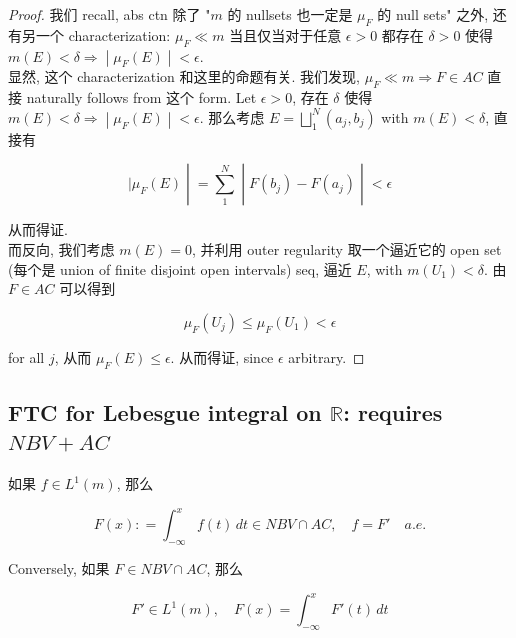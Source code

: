 \documentclass{qlnotes-export}
\begin{document}
\begin{proof}

我们 recall, abs ctn 除了 "\(m\) 的 nullsets 也一定是 \(\mu_{F}\) 的 null sets" 之外, 还有另一个 characterization: \(\mu_{F} \ll m\) 当且仅当对于任意 \(\epsilon > 0\) 都存在 \(\delta > 0\) 使得 \(\left. m(E) < \delta\Longrightarrow \middle| \mu_{F}(E) \middle| < \epsilon \right.\).\\
显然, 这个 characterization 和这里的命题有关. 我们发现, \(\mu_{F} \ll m\Longrightarrow F \in AC\) 直接 naturally follows from 这个 form. Let \(\epsilon > 0\), 存在 \(\delta\) 使得 \(\left. m(E) < \delta\Longrightarrow \middle| \mu_{F}(E) \middle| < \epsilon \right.\). 那么考虑 \(E = \bigsqcup_{1}^{N}(a_{j},b_{j})\) with \(m(E) < \delta\), 直接有

\[\left. |\mu_{F}(E) \middle| = \sum\limits_{1}^{N} \middle| F(b_{j}) - F(a_{j}) \middle| < \epsilon \right.\]

从而得证.\\
而反向, 我们考虑 \(m(E) = 0\), 并利用 outer regularity 取一个逼近它的 open set (每个是 union of finite disjoint open intervals) seq, 逼近 \(E\), with \(m(U_{1}) < \delta\). 由 \(F \in AC\) 可以得到

\[\mu_{F}(U_{j}) \leq \mu_{F}(U_{1}) < \epsilon\]

for all \(j\), 从而 \(\mu_{F}(E) \leq \epsilon\). 从而得证, since \(\epsilon\) arbitrary.

\end{proof}

\subsection{\texorpdfstring{FTC for Lebesgue integral on \(\mathbb{R}\): requires \(NBV + AC\)}{FTC for Lebesgue integral on \textbackslash mathbb\{R\}: requires NBV + AC}}\label{ftc-for-lebesgue-integral-on-mathbbr-requires-nbv-ac}

\begin{corollary}

如果 \(f \in L^{1}(m)\), 那么

\[F(x): = \int_{- \infty}^{x}f(t)\, dt \in NBV \cap AC,\quad f = F'\quad a.e.\]

Conversely, 如果 \(F \in NBV \cap AC\), 那么

\[F' \in L^{1}(m),\quad F(x) = \int_{- \infty}^{x}F'(t)\, dt\]

\end{corollary}
\end{document}
